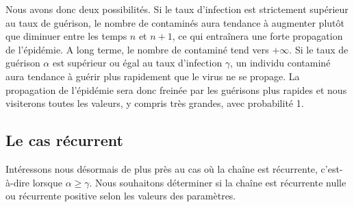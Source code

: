 \documentclass[12pt,a4paper]{report}
\theoremstyle{remark}
\begin{document}
Nous avons donc deux possibilités. Si le taux d'infection est strictement supérieur au taux de guérison, le nombre de contaminés aura tendance à augmenter plutôt que diminuer entre les temps $n$ et $n+1$, ce qui entraînera une forte propagation de l'épidémie. A long terme, le nombre de contaminé tend vers $+\infty$. Si le taux de guérison $\alpha$ est supérieur ou égal au taux  d'infection $\gamma$, un individu contaminé aura tendance à guérir plus rapidement que le virus ne se propage. La propagation de l'épidémie sera donc freinée par les guérisons plus rapides et nous visiterons toutes les valeurs, y compris très grandes, avec probabilité 1.
\\
\subsection{Le cas récurrent}
\vspace{0.6cm}

Intéressons nous désormais de plus près au cas où la chaîne est récurrente, c'est-à-dire lorsque $\alpha \geqslant \gamma$. Nous souhaitons déterminer si la chaîne est récurrente nulle ou récurrente positive selon les valeurs des paramètres. 
\end{document}
